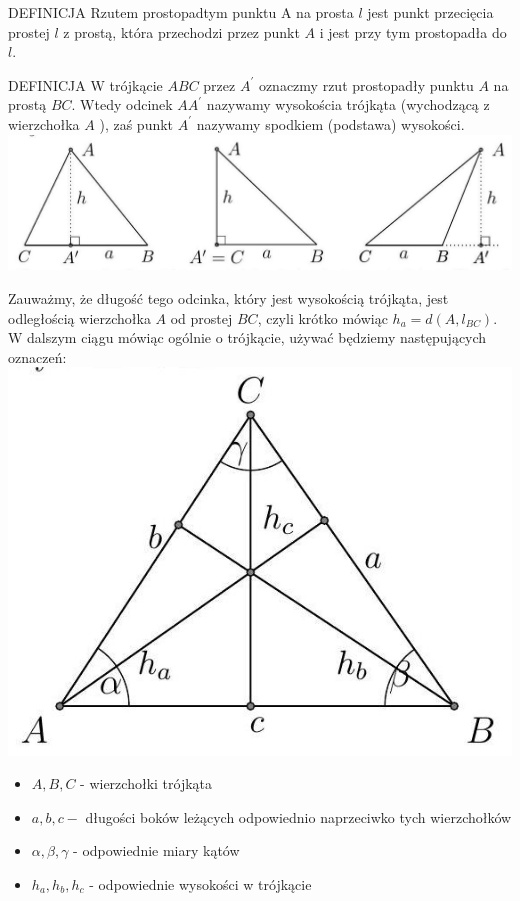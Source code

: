\documentclass[10pt]{article}
\begin{document}
DEFINICJA Rzutem prostopadtym punktu A na prosta \(l\) jest punkt przecięcia prostej \(l\) z prostą, która przechodzi przez punkt \(A\) i jest przy tym prostopadła do \(l\).

DEFINICJA W trójkącie \(A B C\) przez \(A^{\prime}\) oznaczmy rzut prostopadły punktu \(A\) na prostą \(B C\). Wtedy odcinek \(A A^{\prime}\) nazywamy wysokościa trójkąta (wychodzącą z wierzchołka \(A\) ), zaś punkt \(A^{\prime}\) nazywamy spodkiem (podstawa) wysokości.\\
\includegraphics[max width=\textwidth, center]{2024_11_21_71f62bd117d375398909g-030(1)}

Zauważmy, że długość tego odcinka, który jest wysokością trójkąta, jest odległością wierzchołka \(A\) od prostej \(B C\), czyli krótko mówiąc \(h_{a}=d\left(A, l_{B C}\right)\). W dalszym ciągu mówiąc ogólnie o trójkącie, używać będziemy następujących oznaczeń:\\
\includegraphics[max width=\textwidth, center]{2024_11_21_71f62bd117d375398909g-030}

\begin{itemize}
  \item \(A, B, C\) - wierzchołki trójkąta
  \item \(a, b, c-\) długości boków leżących odpowiednio naprzeciwko tych wierzchołków
  \item \(\alpha, \beta, \gamma\) - odpowiednie miary kątów
  \item \(h_{a}, h_{b}, h_{c}\) - odpowiednie wysokości w trójkącie
\end{itemize}
\end{document}
